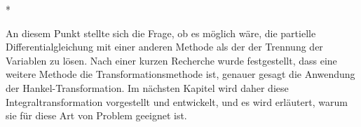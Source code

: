 \begin{center}
	* \quad *\quad *
\end{center}
An diesem Punkt stellte sich die Frage, ob es möglich wäre, die partielle Differentialgleichung mit einer anderen Methode als der der Trennung der Variablen zu lösen. Nach einer kurzen Recherche wurde festgestellt, dass eine weitere Methode die Transformationsmethode ist, genauer gesagt die Anwendung der Hankel-Transformation. Im nächsten Kapitel wird daher diese Integraltransformation vorgestellt und entwickelt, und es wird erläutert, warum sie für diese Art von Problem geeignet ist.
